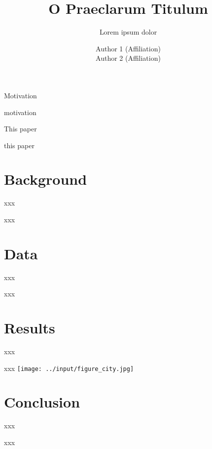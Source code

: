 \documentclass[10pt,t,aspectratio=169]{beamer}
\title{O Praeclarum Titulum}
\subtitle{Lorem ipsum dolor}
\date{}
\author{Author 1 (Affiliation) \\
        Author 2 (Affiliation)}
\begin{document}
\maketitle

\begin{frame}{Motivation}

    motivation

\end{frame}

\begin{frame}{This paper}

    this paper
  
\end{frame}

\section{Background}

\begin{frame}{xxx}

    xxx
  
\end{frame}

\section{Data}

\begin{frame}{xxx}

    xxx
  
\end{frame}

\section{Results}

\begin{frame}{xxx}

    

\end{frame}

\begin{frame}{xxx}
    \centering
    \texttt{[image: ../input/figure\_city.jpg]}
  
\end{frame}

\section{Conclusion}

\begin{frame}{xxx}

    xxx
  
\end{frame}
\end{document}
